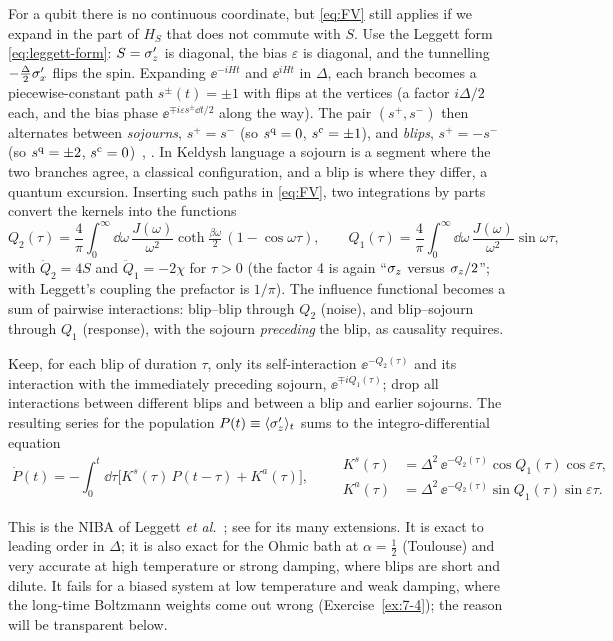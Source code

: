 For a qubit there is no continuous coordinate, but \cref{eq:FV} still applies if we expand in the part of $H_S$ that does not commute with $S$.
Use the Leggett form \eqref{eq:leggett-form}: $S=\sigma_z'$ is diagonal, the bias $\varepsilon$ is diagonal, and the tunnelling $-\tfrac\Delta2\sigma_x'$ flips the spin.
Expanding $\ee^{-iHt}$ and $\ee^{iHt}$ in $\Delta$, each branch becomes a piecewise-constant path $s^\pm(t)=\pm1$ with flips at the vertices (a factor $i\Delta/2$ each, and the bias phase $\ee^{\mp i\varepsilon s^\pm\dd t/2}$ along the way).
The pair $(s^+,s^-)$ then alternates between \emph{sojourns}, $s^+=s^-$ (so $s^{\mathrm{q}}=0$, $s^{\mathrm{c}}=\pm1$), and \emph{blips}, $s^+=-s^-$ (so $s^{\mathrm{q}}=\pm2$, $s^{\mathrm{c}}=0$)~\cite[Sec.~IV]{Leggett1987}, \cite[Ch.~21]{Weiss2012}.
In Keldysh language a sojourn is a segment where the two branches agree, a classical configuration, and a blip is where they differ, a quantum excursion.
Inserting such paths in \cref{eq:FV}, two integrations by parts convert the kernels into the functions
\begin{equation}
  Q_2(\tau)=\frac4\pi\int_0^\infty\!\dd\omega\,\frac{J(\omega)}{\omega^2}\coth\tfrac{\beta\omega}2\,(1-\cos\omega\tau),\qquad
  Q_1(\tau)=\frac4\pi\int_0^\infty\!\dd\omega\,\frac{J(\omega)}{\omega^2}\sin\omega\tau,
  \label{eq:Q12}
\end{equation}
with $\ddot Q_2=4S$ and $\ddot Q_1=-2\chi$ for $\tau>0$ (the factor 4 is again ``$\sigma_z$ versus $\sigma_z/2$''; with Leggett's coupling the prefactor is $1/\pi$).
The influence functional becomes a sum of pairwise interactions: blip--blip through $Q_2$ (noise), and blip--sojourn through $Q_1$ (response), with the sojourn \emph{preceding} the blip, as causality requires.

\begin{keybox}
Keep, for each blip of duration $\tau$, only its self-interaction $\ee^{-Q_2(\tau)}$ and its interaction with the immediately preceding sojourn, $\ee^{\mp iQ_1(\tau)}$; drop all interactions between different blips and between a blip and earlier sojourns.
The resulting series for the population $P(t)\equiv\langle\sigma_z'\rangle_t$ sums to the integro-differential equation
\begin{equation}
  \boxed{\;\dot P(t)=-\int_0^t\!\dd\tau\Big[K^s(\tau)\,P(t-\tau)+K^a(\tau)\Big],\qquad
  \begin{aligned}
  K^s(\tau)&=\Delta^2\,\ee^{-Q_2(\tau)}\cos Q_1(\tau)\cos\varepsilon\tau,\\
  K^a(\tau)&=\Delta^2\,\ee^{-Q_2(\tau)}\sin Q_1(\tau)\sin\varepsilon\tau .
  \end{aligned}\;}
  \label{eq:NIBA}
\end{equation}
\end{keybox}
This is the NIBA of Leggett \emph{et al.}~\cite[Sec.~V]{Leggett1987}; see \cite[Ch.~21]{Weiss2012} for its many extensions.
It is exact to leading order in $\Delta$; it is also exact for the Ohmic bath at $\alpha=\tfrac12$ (Toulouse) and very accurate at high temperature or strong damping, where blips are short and dilute.
It fails for a biased system at low temperature and weak damping, where the long-time Boltzmann weights come out wrong (Exercise~\ref{ex:7-4}); the reason will be transparent below.

